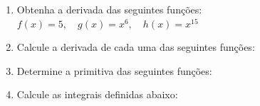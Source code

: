 \documentclass{article}
\begin{document}
\begin{enumerate}

    
\item Obtenha a derivada das seguintes funções:\\
$f(x) = 5, \quad g(x)=x^6, \quad h(x)=x^{15}$
   
\item Calcule a derivada de cada uma das seguintes funções:
\begin{enumerate}
\end{enumerate}

   
\item Determine a primitiva das seguintes funções:
\begin{enumerate}
\end{enumerate}

   
\item Calcule as integrais definidas abaixo:
\begin{enumerate}
\end{enumerate}

	
		
	
\end{enumerate}
\end{document}

